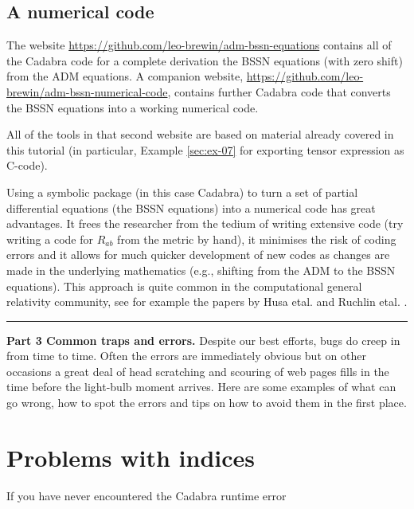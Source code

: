 \documentclass[a4paper,12pt]{article}
\numberwithin{equation}{section}%
\begin{document}
\subsection{A numerical code}

The website \url{https://github.com/leo-brewin/adm-bssn-equations} contains all of the
Cadabra code for a complete derivation the BSSN equations (with zero shift) from the ADM
equations. A companion website, \url{https://github.com/leo-brewin/adm-bssn-numerical-code},
contains further Cadabra code that converts the BSSN equations into a working numerical code.

All of the tools in that second website are based on material already covered in this tutorial
(in particular, Example \ref{sec:ex-07} for exporting tensor expression as C-code).

Using a symbolic package (in this case Cadabra) to turn a set of partial differential
equations (the BSSN equations) into a numerical code has great advantages. It frees the
researcher from the tedium of writing extensive code (try writing a code for $R_{ab}$ from
the metric by hand), it minimises the risk of coding errors and it allows for much quicker
development of new codes as changes are made in the underlying mathematics (e.g., shifting
from the ADM to the BSSN equations). This approach is quite common in the computational general
relativity community, see for example the papers by Husa etal. \cite{husa:2006-01} and
Ruchlin etal. \cite{ruchlin:2018-01}.

\clearpage

\hrule height 0pt
\vskip 4cm
{\Huge\bf Part 3 Common traps and errors.}
\vskip 2cm
Despite our best efforts, bugs do creep in from time to time. Often the errors are
immediately obvious but on other occasions a great deal of head scratching and scouring of
web pages fills in the time before the light-bulb moment arrives. Here are some examples of
what can go wrong, how to spot the errors and tips on how to avoid them in the first place.

\clearpage

\section*{Problems with indices}
If you have never encountered the Cadabra runtime error
\end{document}
